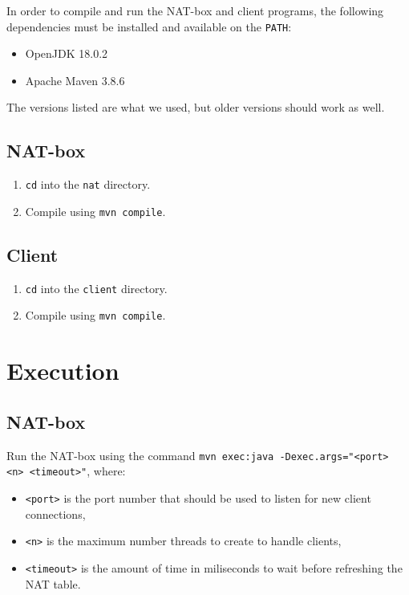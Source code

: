 \documentclass[10pt, a4paper]{article}
\begin{document}
In order to compile and run the NAT-box and client programs, the following
dependencies must be installed and available on the \texttt{PATH}:
\begin{itemize}
  \item OpenJDK 18.0.2
  \item Apache Maven 3.8.6
\end{itemize}
The versions listed are what we used, but older versions should work as well.


\subsection{NAT-box}
\label{ssec:compnat}

\begin{enumerate}
  \item \texttt{cd} into the \texttt{nat} directory.
  \item Compile using \texttt{mvn compile}.
\end{enumerate}


\subsection{Client}
\label{ssec:compcli}

\begin{enumerate}
  \item \texttt{cd} into the \texttt{client} directory.
  \item Compile using \texttt{mvn compile}.
\end{enumerate}



\section{Execution}
\label{sec:exec}


\subsection{NAT-box}
\label{ssec:execnat}

Run the NAT-box using the command \texttt{mvn exec:java -Dexec.args="<port> <n>
<timeout>"}, where:
\begin{itemize}
  \item \texttt{<port>} is the port number that should be used to listen for new
    client connections,
  \item \texttt{<n>} is the maximum number threads to create to handle clients,
  \item \texttt{<timeout>} is the amount of time in miliseconds to wait before
    refreshing the NAT table.
\end{itemize}
\end{document}
